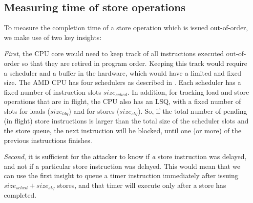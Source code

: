 \subsection{Measuring time of store operations}
\label{subsec:interconnect-sc-store-ops-measuring-time}

To measure the completion time of a store operation which is issued out-of-order, we make use of two key insights:

\textit{First}, the CPU core would need to keep track of all instructions executed out-of-order so that they are retired in program order.
Keeping this track would require a scheduler and a buffer in the hardware, which would have a limited and fixed size.
The AMD CPU has four schedulers as described in . Each scheduler has a fixed number of instruction slots $size_{sched}$.
In addition, for tracking load and store operations that are in flight, the CPU also has an LSQ, with a fixed number of slots for loads ($size_{ldq}$) and for stores ($size_{stq}$).
So, if the total number of pending (in flight) store instructions is larger than the total size of the scheduler slots and the store queue, the next instruction will be blocked, until one (or more) of the previous instructions finishes.

\textit{Second}, it is sufficient for the attacker to know if \textit{a} store instruction was delayed, and not if a particular store instruction was delayed.
This would mean that we can use the first insight to queue a timer instruction immediately after issuing $size_{sched} + size_{stq}$ stores, and that timer will execute only after a store has completed.
